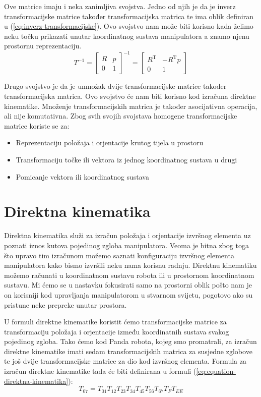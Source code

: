\documentclass[times, utf8, diplomskirad]{fer}
\begin{document}
Ove matrice imaju i neka zanimljiva svojstva.
Jedno od njih je da je inverz transformacijske matrice također transformacijska matrica te ima oblik definiran u (\ref{eq:inverz-transformacijske}).
Ovo svojstvo nam može biti korisno kada želimo neku točku prikazati unutar koordinatnog sustava manipulatora a znamo njenu prostornu reprezentaciju.
\begin{equation}
    T^{-1}=\left[\begin{array}{cc}
    R & p \\
    0 & 1
    \end{array}\right]^{-1}=\left[\begin{array}{cc}
    R^{\mathrm{T}} & -R^{\mathrm{T}} p \\
    0 & 1
    \end{array}\right]
\label{eq:inverz-transformacijske}
\end{equation}

Drugo svojstvo je da je umnožak dvije transformacijske matrice također transformacijska matrica.
Ovo svojstvo će nam biti korisno kod izračuna direktne kinematike.
Množenje transformacijskih matrica je također asocijativna operacija, ali nije komutativna.
Zbog svih svojih svojstava homogene transformacijske matrice koriste se za:
\begin{itemize}
    \item Reprezentaciju položaja i orjentacije krutog tijela u prostoru
    \item Transformaciju točke ili vektora iz jednog koordinatnog sustava u drugi
    \item Pomicanje vektora ili koordinatnog sustava
\end{itemize}

\newpage
\section{Direktna kinematika}
Direktna kinematika služi za izračun položaja i orjentacije izvršnog elementa uz poznati iznos kutova pojedinog zgloba manipulatora.
Veoma je bitna zbog toga što upravo tim izračunom možemo saznati konfiguraciju izvršnog elementa manipulatora kako bismo izvršili neku nama korisnu radnju.
Direktnu kinematiku možemo računati u koordinatnom sustavu robota ili u prostornom koordinatnom sustavu.
Mi ćemo se u nastavku fokusirati samo na prostorni oblik pošto nam je on korisniji kod upravljanja manipulatorom u stvarnom svijetu, pogotovo ako su pristune neke prepreke unutar prostora.

U formuli direktne kinematike koristit ćemo transformacijske matrice za transformaciju položaja i orjentacije između koordinatnih sustava svakog pojedinog zgloba.
Tako ćemo kod Panda robota, kojeg smo promatrali, za izračun direktne kinematike imati sedam transformacijskih matrica za susjedne zglobove te još dvije transformacijske matrice za dio kod izvršnog elementa.
Formula za izračun direktne kinematike tada će biti definirana u formuli (\ref{eq:equation-direktna-kinematika}):
\begin{equation}
T_{07}=T_{01} T_{12} T_{23} T_{34} T_{45} T_{56} T_{67} T_{F} T_{EE}
    \label{eq:equation-direktna-kinematika}
\end{equation}
\end{document}

